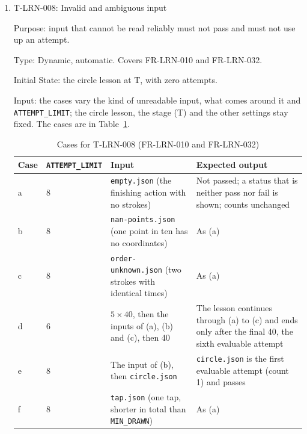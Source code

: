 \documentclass[12pt, titlepage]{article}
\newcommand{\testitem}[1]{\item #1\par\nopagebreak}
\begin{document}
\begin{enumerate}
Output: the expected output of each case is in its row of
Table~\ref{tab:t-lrn-007}; the test passes when every case gives it.

Test Case Derivation: every case follows the ``Interrupted or invalid input'' row of SRS
Section~9.2 (the level does not change, no pass, and neither count goes up)
and the fit criterion, which interrupts both between and
during strokes. (d) uses a drawing that would pass, so a pass could only
come from the interruption. The interrupted mark in (b) is FR-REC-005
(T-REC-005).

How test will be performed: Playwright, reading the stage and the counts
from the lesson state and the records.

\testitem{T-LRN-008: Invalid and ambiguous input}

Purpose: input that cannot be read reliably must not pass and must not use
up an attempt.

Type: Dynamic, automatic. Covers FR-LRN-010 and FR-LRN-032.

Initial State: the circle lesson at T, with zero attempts.

Input: the cases vary the kind of unreadable input, what comes around it
and \texttt{ATTEMPT\_LIMIT}; the circle lesson, the stage (T) and the other
settings stay fixed. The cases are in Table~\ref{tab:t-lrn-008}.

\begin{table}[htbp]
\centering\small
\caption{Cases for T-LRN-008 (FR-LRN-010 and FR-LRN-032)}
\label{tab:t-lrn-008}
\begin{tabularx}{\textwidth}{@{}l l >{\raggedright\arraybackslash}X
  >{\raggedright\arraybackslash}X@{}}
\toprule
\textbf{Case} & \textbf{\texttt{ATTEMPT\_LIMIT}} & \textbf{Input} &
\textbf{Expected output}\\
\midrule
a & 8 & \texttt{empty.json} (the finishing action with no strokes) &
Not passed; a status that is neither pass nor fail is shown; counts
unchanged\\
b & 8 & \texttt{nan-\allowbreak{}points.json} (one point in ten has
no coordinates) & As (a)\\
c & 8 & \texttt{order-\allowbreak{}unknown.json} (two strokes with
identical times) & As (a)\\
d & 6 & $5 \times 40$, then the inputs of (a), (b)
and (c), then 40 & The lesson continues through (a) to (c) and ends only
after the final 40, the sixth evaluable attempt\\
e & 8 & The input of (b), then \texttt{circle.json} &
\texttt{circle.json} is the first evaluable attempt (count 1) and passes\\
f & 8 & \texttt{tap.json} (one tap, shorter in total than
\texttt{MIN\_DRAWN}) & As (a)\\
\bottomrule
\end{tabularx}
\end{table}


\end{enumerate}
\end{document}
